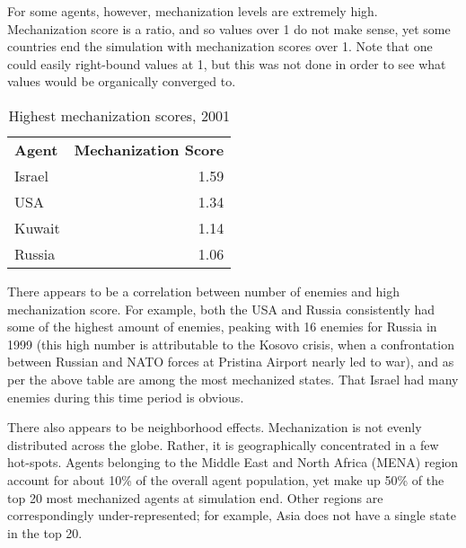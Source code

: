 \documentclass{article}
\begin{document}
For some agents, however, mechanization levels are extremely high. 
Mechanization score is a ratio, and so values over 1 do not make sense, 
yet some countries end the simulation with mechanization scores over 1. Note
that one could easily right-bound values at 1, but this was not done in order to
see what values would be organically converged to.

\begin{table}[h]
	\centering
	\caption{Highest mechanization scores, 2001}
	\begin{tabular}{|l r|}
		\hline
		\textbf{Agent} & \textbf{Mechanization Score} \\
		Israel & 1.59 \\
		USA & 1.34 \\
		Kuwait & 1.14 \\
		Russia & 1.06 \\
		\hline
	\end{tabular}
\end{table}

There appears to be a correlation between number of enemies and high
mechanization score. For example, both the USA and Russia consistently had some
of the highest amount of enemies, peaking with 16 enemies for Russia in 1999
(this high number is attributable to the Kosovo crisis, when a confrontation between Russian and NATO forces
at Pristina Airport nearly led to war), and as per the above table are among the
most mechanized states. That Israel had many enemies during this time period is
obvious. 

There also appears to be neighborhood effects. Mechanization is not evenly
distributed across the globe. Rather, it is geographically concentrated in a few
hot-spots. Agents belonging to the Middle East and North Africa (MENA) region
account for about 10\% of the overall agent population, yet make up 50\% of the
top 20 most mechanized agents at simulation end. Other regions
are correspondingly under-represented; for example, Asia does not have a single
state in the top 20.
\end{document}
